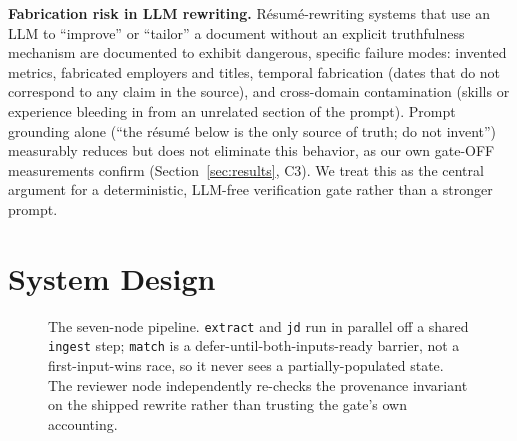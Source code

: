 \documentclass{article}
\begin{document}
\textbf{Fabrication risk in LLM rewriting.} Résumé-rewriting systems that use an LLM to
``improve'' or ``tailor'' a document without an explicit truthfulness mechanism are documented to
exhibit dangerous, specific failure modes: invented metrics, fabricated employers and titles,
temporal fabrication (dates that do not correspond to any claim in the source), and cross-domain
contamination (skills or experience bleeding in from an unrelated section of the prompt). Prompt
grounding alone (``the résumé below is the only source of truth; do not invent'') measurably
reduces but does not eliminate this behavior, as our own gate-OFF measurements confirm
(Section~\ref{sec:results}, C3). We treat this as the central argument for a deterministic,
LLM-free verification gate rather than a stronger prompt.

\section{System Design}

\begin{figure}[h]
\centering
{}
\caption{The seven-node pipeline. \texttt{extract} and \texttt{jd} run in parallel off a shared
\texttt{ingest} step; \texttt{match} is a defer-until-both-inputs-ready barrier, not a
first-input-wins race, so it never sees a partially-populated state. The reviewer node
independently re-checks the provenance invariant on the shipped rewrite rather than trusting the
gate's own accounting.}
\label{fig:pipeline}
\end{figure}
\end{document}
